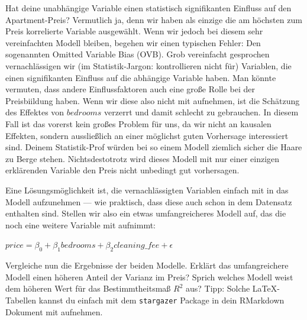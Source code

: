 \documentclass[
]{book}
\begin{document}
Hat deine unabhängige Variable einen statistisch signifikanten Einfluss auf den Apartment-Preis?
Vermutlich ja, denn wir haben als einzige die am höchsten zum Preis korrelierte Variable ausgewählt.
Wenn wir jedoch bei diesem sehr vereinfachten Modell bleiben, begehen wir einen typischen Fehler:
Den sogenannten Omitted Variable Bias (OVB).
Grob vereinfacht gesprochen vernachlässigen wir (im Statistik-Jargon: kontrollieren nicht für) Variablen, die einen signifikanten Einfluss auf die abhängige Variable haben.
Man könnte vermuten, dass andere Einflussfaktoren auch eine große Rolle bei der Preisbiildung haben.
Wenn wir diese also nicht mit aufnehmen, ist die Schätzung des Effektes von \(bedrooms\) verzerrt und damit schlecht zu gebrauchen.
In diesem Fall ist das vorerst kein großes Problem für uns, da wir nicht an kausalen Effekten, sondern aussließlich an einer möglichst guten Vorhersage interessiert sind.
Deinem Statistik-Prof würden bei so einem Modell ziemlich sicher die Haare zu Berge stehen.
Nichtsdestotrotz wird dieses Modell mit nur einer einzigen erklärenden Variable den Preis nicht unbedingt gut vorhersagen.

Eine Lösungsmöglichkeit ist, die vernachlässigten Variablen einfach mit in das Modell aufzunehmen --- wie praktisch, dass diese auch schon in dem Datensatz enthalten sind. Stellen wir also ein etwas umfangreicheres Modell auf, das die noch eine weitere Variable mit aufnimmt:

\begin{center} $price = \beta_0 + \beta_1 bedrooms + \beta_2 cleaning\_fee + \epsilon$ \end{center}

Vergleiche nun die Ergebnisse der beiden Modelle.
Erklärt das umfangreichere Modell einen höheren Anteil der Varianz im Preis?
Sprich welches Modell weist dem höheren Wert für das Bestimmtheitsmaß \(R^2\) aus?
Tipp: Solche LaTeX-Tabellen kannst du einfach mit dem \texttt{stargazer} Package in dein RMarkdown Dokument mit aufnehmen.
\end{document}
